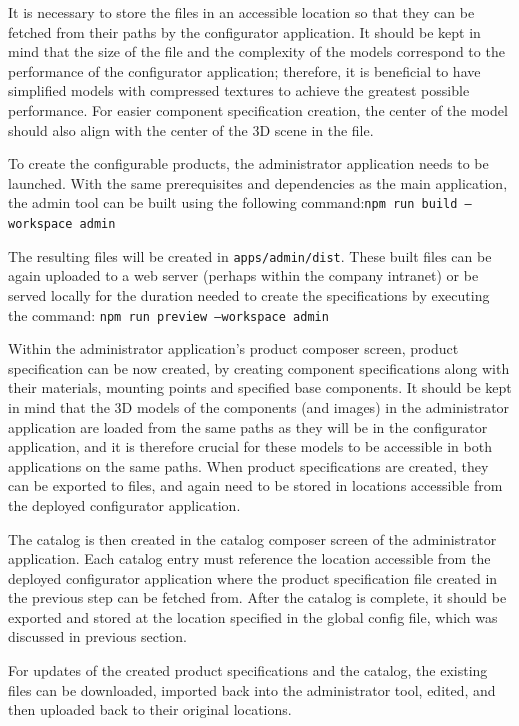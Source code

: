 It is necessary to store the files in an accessible location so that they can be fetched from their paths by the configurator application. It should be kept in mind that the size of the file and the complexity of the models correspond to the performance of the configurator application; therefore, it is beneficial to have simplified models with compressed textures to achieve the greatest possible performance. For easier component specification creation, the center of the model should also align with the center of the 3D scene in the file.

To create the configurable products, the administrator application needs to be launched. With the same prerequisites and dependencies as the main application, the admin tool can be built using the following command:\linebreak\texttt{npm run build --workspace admin}

The resulting files will be created in \texttt{apps/admin/dist}. These built files can be again uploaded to a web server (perhaps within the company intranet) or be served locally for the duration needed to create the specifications by executing the command: \texttt{npm run preview --workspace admin}

Within the administrator application's product composer screen, product specification can be now created, by creating component specifications along with their materials, mounting points and specified base components. It should be kept in mind that the 3D models of the components (and images) in the administrator application are loaded from the same paths as they will be in the configurator application, and it is therefore crucial for these models to be accessible in both applications on the same paths. When product specifications are created, they can be exported to  files, and again need to be stored in locations accessible from the deployed configurator application.

The catalog is then created in the catalog composer screen of the administrator application. Each catalog entry must reference the location accessible from the deployed configurator application where the product specification file created in the previous step can be fetched from. After the catalog is complete, it should be exported and stored at the location specified in the global config file, which was discussed in previous section.

For updates of the created product specifications and the catalog, the existing files can be downloaded, imported back into the administrator tool, edited, and then uploaded back to their original locations.


